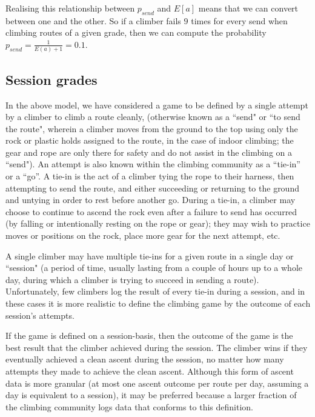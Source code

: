 \documentclass[12pt]{article}
\begin{document}
Realising this relationship between $p_{send}$ and $ E\left[a\right]$ means that we can convert between one and the other. So if a climber fails $9$ times for every send when climbing routes of a given grade, then we can compute the probability  $p_{send} = \frac{1}{E(a)+1} = 0.1$.

\subsection{Session grades}

In the above model, we have considered a game to be defined by a single attempt by a climber to climb a route cleanly, (otherwise known as a ``send" or ``to send the route", wherein a climber moves from the ground to the top using only the rock or plastic holds assigned to the route, in the case of indoor climbing; the gear and rope are only there for safety and do not assist in the climbing on a ``send"). An attempt is also known within the climbing community as a ``tie-in'' or a ``go''. A tie-in is the act of a climber tying the rope to their harness, then attempting to send the route, and either succeeding or returning to the ground and untying in order to rest before another go.  During a tie-in, a climber may choose to continue to ascend the rock even after a failure to send has occurred (by falling or intentionally resting on the rope or gear); they may wish to practice moves or positions on the rock, place more gear for the next attempt, etc.

A single climber may have multiple tie-ins for a given route in a single day or ``session" (a period of time, usually lasting from a couple of hours up to a whole day, during which a climber is trying to succeed in sending a route).  Unfortunately, few climbers log the result of every tie-in during a session, and in these cases it is more realistic to define the climbing game by the outcome of each session's attempts.

If the game is defined on a session-basis, then the outcome of the game is the best result that the climber achieved during the session. The climber wins if they eventually achieved a clean ascent during the session, no matter how many attempts they made to achieve the clean ascent. Although this form of ascent data is more granular (at most one ascent outcome per route per day, assuming a day is equivalent to a session), it may be preferred because a larger fraction of the climbing community logs data that conforms to this definition.
\end{document}
